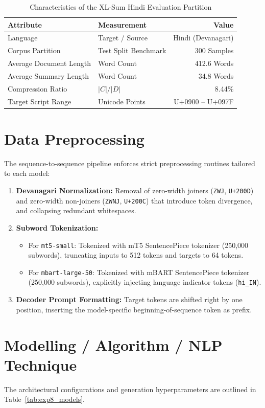 \documentclass[12pt,a4paper]{report}
\begin{document}
\begin{table}[H]
\centering
\caption{Characteristics of the XL-Sum Hindi Evaluation Partition}
\label{tab:exp8_data_summary}
\begin{tabular}{llr}
\toprule
\textbf{Attribute} & \textbf{Measurement} & \textbf{Value} \\
\midrule
Language & Target / Source & Hindi (Devanagari) \\
Corpus Partition & Test Split Benchmark & 300 Samples \\
Average Document Length & Word Count & 412.6 Words \\
Average Summary Length & Word Count & 34.8 Words \\
Compression Ratio & $|C| / |D|$ & 8.44\% \\
Target Script Range & Unicode Points & U+0900 -- U+097F \\
\bottomrule
\end{tabular}
\end{table}

\section{Data Preprocessing}
The sequence-to-sequence pipeline enforces strict preprocessing routines tailored to each model:
\begin{enumerate}
    \item \textbf{Devanagari Normalization:} Removal of zero-width joiners (\texttt{ZWJ}, \texttt{U+200D}) and zero-width non-joiners (\texttt{ZWNJ}, \texttt{U+200C}) that introduce token divergence, and collapsing redundant whitespaces.
    \item \textbf{Subword Tokenization:}
    \begin{itemize}
        \item For \texttt{mt5-small}: Tokenized with mT5 SentencePiece tokenizer (250,000 subwords), truncating inputs to 512 tokens and targets to 64 tokens.
        \item For \texttt{mbart-large-50}: Tokenized with mBART SentencePiece tokenizer (250,000 subwords), explicitly injecting language indicator tokens (\texttt{hi\_IN}).
    \end{itemize}
    \item \textbf{Decoder Prompt Formatting:} Target tokens are shifted right by one position, inserting the model-specific beginning-of-sequence token as prefix.
\end{enumerate}

\section{Modelling / Algorithm / NLP Technique}
The architectural configurations and generation hyperparameters are outlined in Table~\ref{tab:exp8_models}.
\end{document}
